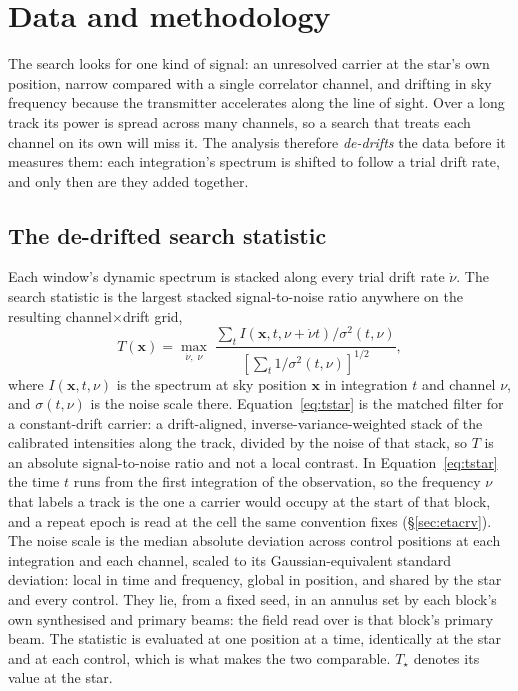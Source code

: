 \section{Data and methodology}
\label{sec:method}

The search looks for one kind of signal: an unresolved carrier at the
star's own position, narrow compared with a single correlator channel, and
drifting in sky frequency because the transmitter accelerates along the line
of sight. Over a long track its power is spread across many channels, so a
search that treats each channel on its own will miss it. The analysis therefore \emph{de-drifts} the data before it measures them:
each integration's spectrum is shifted to follow a trial drift rate, and only
then are they added together.

\subsection{The de-drifted search statistic}
\label{sec:statistic}

Each window's dynamic spectrum is stacked along every trial drift rate
$\dot\nu$. The search statistic is the largest stacked signal-to-noise
ratio anywhere on the resulting channel$\times$drift grid,
%
\begin{equation}
T(\mathbf{x})=\max_{\dot\nu,\;\nu}\;
\frac{\sum_{t} I\!\left(\mathbf{x},t,\nu+\dot\nu t\right)\big/\sigma^{2}(t,\nu)}
     {\left[\sum_{t}1\big/\sigma^{2}(t,\nu)\right]^{1/2}},
\label{eq:tstar}
\end{equation}
%
where $I(\mathbf{x},t,\nu)$ is the spectrum at sky position $\mathbf{x}$
in integration $t$ and channel $\nu$, and $\sigma(t,\nu)$ is the noise scale
there. Equation~\ref{eq:tstar} is the matched filter for a constant-drift
carrier: a drift-aligned, inverse-variance-weighted stack of the calibrated
intensities along the track, divided by the noise of that stack, so $T$ is an
absolute signal-to-noise ratio and not a local contrast. In Equation~\ref{eq:tstar} the time $t$ runs from the first integration of the
observation, so the frequency $\nu$ that labels a track is the one a carrier
would occupy at the start of that block, and a repeat epoch is read at the
cell the same convention fixes (\S\ref{sec:etacrv}).
The noise scale is the median absolute deviation
across \NCtrl{} control positions at each integration and each channel,
scaled to its Gaussian-equivalent standard deviation: local in time and
frequency, global in position, and shared by the star and every control.
They lie, from a fixed seed, in an annulus set by each block's own
synthesised and primary beams: the field read over is that block's primary
beam.
The statistic is evaluated at one position at a time, identically at the
star and at each control, which is what makes the two comparable.
$T_\star$ denotes its value at the star.

